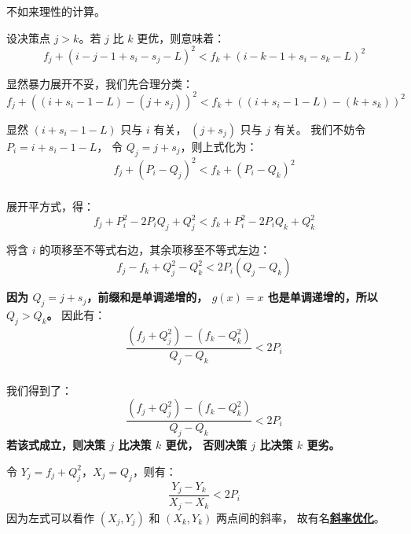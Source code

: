 \documentclass[9pt, UTF8]{beamer} %
\newcommand \fts {\frametitle{\insertsubsection}}
\newcommand \bpause { \bigskip \pause }
\begin{document}
	\begin{frame}
		\fts

		不如来理性的计算。

		\bpause

		设决策点 $j > k$。若 $j$ 比 $k$ 更优，则意味着：
		$$
		f_j + (i - j - 1 + s_i - s_j - L)^2 <
		f_k + (i - k - 1 + s_i - s_k - L)^2
		$$

		\pause

		显然暴力展开不妥，我们先合理分类：
		$$
		f_j + ((i + s_i - 1 - L) - (j + s_j))^2 <
		f_k + ((i + s_i - 1 - L) - (k + s_k))^2
		$$

		\pause

		显然 $(i + s_i - 1 - L)$ 只与 $i$ 有关，
		$(j + s_j)$ 只与 $j$ 有关。
		我们不妨令 $P_i = i + s_i - 1 - L$，
		令 $Q_j = j + s_j$，则上式化为：
		$$
		f_j + (P_i - Q_j)^2 <
		f_k + (P_i - Q_k)^2
		$$
	\end{frame}

	\begin{frame}
		\fts

		展开平方式，得：
		$$
		f_j + P_i^2 - 2 P_i Q_j + Q_j^2 <
		f_k + P_i^2 - 2 P_i Q_k + Q_k^2
		$$

		\pause

		将含 $i$ 的项移至不等式右边，其余项移至不等式左边：
		$$
		f_j - f_k + Q_j^2 - Q_k^2 < 2 P_i (Q_j - Q_k)
		$$

		\pause

		\textbf{因为 $Q_j = j + s_j$，前缀和是单调递增的，
		$g(x) = x$ 也是单调递增的，所以 $Q_j > Q_k$。}
		因此有：
		$$
		\frac {(f_j + Q_j^2) - (f_k - Q_k^2)} {Q_j - Q_k} < 2 P_i
		$$
	\end{frame}

	\begin{frame}
		\fts

		我们得到了：
		$$
		\frac {(f_j + Q_j^2) - (f_k - Q_k^2)} {Q_j - Q_k} < 2 P_i
		$$
		\textbf{若该式成立，则决策 $j$ 比决策 $k$ 更优，
		否则决策 $j$ 比决策 $k$ 更劣。}

		\bpause

		令 $Y_j = f_j + Q_j^2$，$X_j = Q_j$，则有：
		$$
		\frac {Y_j - Y_k} {X_j - X_k} < 2 P_i
		$$
		因为左式可以看作 $(X_j, Y_j)$ 和 $(X_k, Y_k)$ 两点间的斜率，
		故有名\textbf{\uline{斜率优化}}。
	\end{frame}
\end{document}
